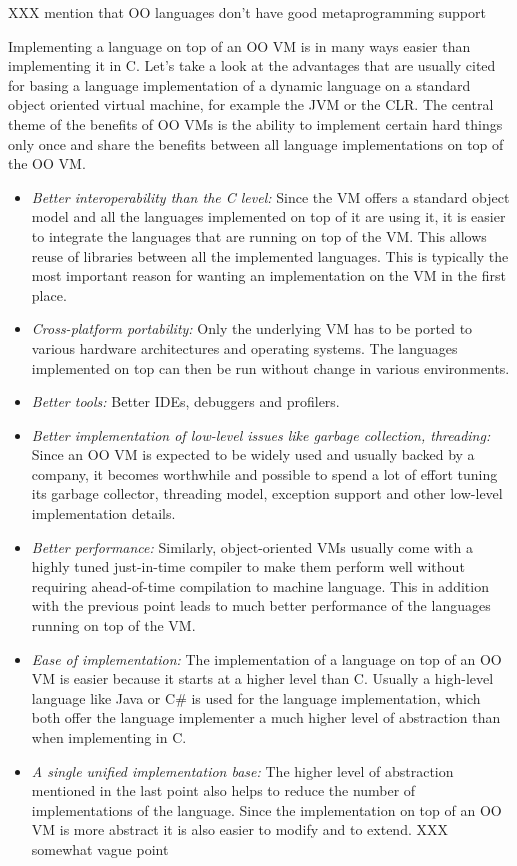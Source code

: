 \documentclass{llncs}
\begin{document}
XXX mention that OO languages don't have good metaprogramming support

Implementing a language on top of an OO VM is in many ways easier than
implementing it in C. Let's take a look at the advantages that are usually
cited for basing a
language implementation of a dynamic language on a standard object oriented
virtual machine, for example the JVM or the CLR. The central theme of the
benefits  of OO VMs is the ability to implement certain hard things only once
and share the benefits between all language implementations on top of the OO VM.

\begin{itemize}
\item
\emph{Better interoperability than the C level:} Since the VM offers a standard
object model and all the languages implemented on top of it are using it, it is
easier to integrate the languages that are running on top of the VM. This
allows reuse of libraries between all the implemented languages. This is
typically the most important reason for wanting an implementation on the VM in
the first place.

\item
\emph{Cross-platform portability:} Only the underlying VM has to be ported to
various hardware architectures and operating systems. The languages implemented
on top can then be run without change in various environments.

\item
\emph{Better tools:} Better IDEs, debuggers and profilers.

\item
\emph{Better implementation of low-level issues like garbage collection,
threading:} Since an OO VM is expected to be widely used and usually backed by
a company, it becomes worthwhile and possible to spend a lot of effort tuning
its garbage collector, threading model, exception support and other low-level
implementation details.

\item
\emph{Better performance:} Similarly, object-oriented VMs usually come with a
highly tuned just-in-time compiler to make them perform well without requiring
ahead-of-time compilation to machine language. This in addition with the
previous point leads to much better performance of the languages running on top
of the VM.

\item
\emph{Ease of implementation:} The implementation of a language on top of an OO
VM is easier because it starts at a higher level than C. Usually a
high-level language like Java or C\# is used for the language implementation,
which both offer the language implementer a much higher level of abstraction
than when implementing in C. 

\item
\emph{A single unified implementation base:} The higher level of abstraction
mentioned in the last point also helps to reduce the number of implementations
of the language. Since the implementation on top of an OO VM is more abstract
it is also easier to modify and to extend. XXX somewhat vague point
\end{itemize}
\end{document}
